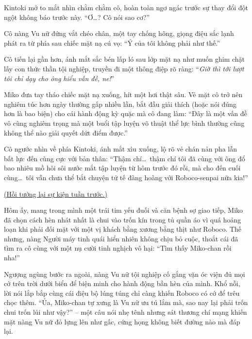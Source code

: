 \documentclass[../main.tex]{subfiles}
\begin{document}
Kintoki mở to mắt nhìn chằm chằm cô, hoàn toàn ngơ ngác trước sự thay đổi đột ngột không báo trước này. ``Ơ\dots? Cô nói sao cơ?''

Cô nàng Vu nữ đứng vắt chéo chân, một tay chống hông, giọng điệu sắc lạnh phát ra từ phía sau chiếc mặt nạ cú vọ: ``Ý của tôi không phải như thế.''


Cô tiến lại gần hơn, ánh mắt sắc bén lấp ló sau lớp mặt nạ như muốn ghim chặt lấy con thức thần tội nghiệp, truyền đi một thông điệp rõ ràng: ``\textit{Giờ thì tới lượt tôi chỉ dạy cho ông hiểu vấn đề, ne!}''

\ct

Miko đưa tay tháo chiếc mặt nạ xuống, hít một hơi thật sâu. Vẻ mặt cô trở nên nghiêm túc hơn ngày thường gấp nhiều lần, bắt đầu giải thích (hoặc nói đúng hơn là bao biện) cho cái hành động kỳ quặc mà cô đang làm: ``Đây là một vấn đề vô cùng nghiêm trọng mà một buổi tập luyện võ thuật thể lực bình thường cũng không thể nào giải quyết dứt điểm được.''

Cô ngước nhìn về phía Kintoki, ánh mắt xìu xuống, lộ rõ vẻ chán nản pha lẫn bất lực đến cùng cực với bản thân: ``Thậm chí\dots\ thậm chí tôi đã cùng với ông đổ bao nhiêu mồ hôi sôi nước mắt tập luyện từ hôm trước đó rồi, mà cho đến cuối cùng\dots\ tôi vẫn chưa thể bắt chuyện tử tế đàng hoàng với Roboco-senpai nữa kia!''

\begin{center}
  \uline{(Hồi tưởng lại sự kiện tuần trước.)}
\end{center}

Hôm ấy, mang trong mình một trái tim yếu đuối và căn bệnh sợ giao tiếp, Miko đã chọn cách hèn nhát nhất là chui vào trốn kín trong tủ quần áo vì quá hoảng loạn khi phải đối mặt với một vị khách bằng xương bằng thịt như Roboco. Thế nhưng, nàng Người máy tinh quái hiển nhiên không chịu bỏ cuộc, thoắt cái đã tìm ra cô cùng với một nụ cười tinh nghịch vô hại: ``Tìm thấy Miko-chan rồi nha!''

Ngượng ngùng bước ra ngoài, nàng Vu nữ tội nghiệp cố gắng vặn óc viện đủ mọi cớ trên trời dưới biển để biện minh cho hành động bần hèn của mình. Khổ nỗi, lời nói lắp bắp cùng cái điệu bộ lúng túng chỉ càng khiến Roboco có cớ để trêu chọc thêm. ``Ủa, Miko-chan tự xưng là Vu nữ ưu tú lắm mà, sao nay lại phải trốn chui trốn lủi như vậy?'' -- một câu nói nhẹ tênh nhưng sát thương chí mạng khiến mặt nàng Vu nữ đỏ lựng lên như gấc, cứng họng không biết đường nào mà đáp lại.
\end{document}
